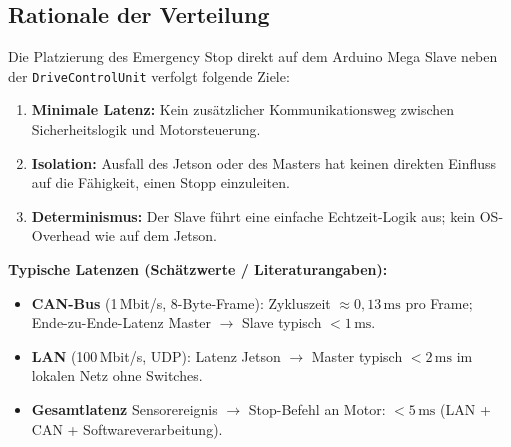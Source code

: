 \subsection{Rationale der Verteilung}

Die Platzierung des Emergency Stop direkt auf dem Arduino Mega Slave
neben der \texttt{DriveControlUnit} verfolgt folgende Ziele:

\begin{enumerate}
  \item \textbf{Minimale Latenz:} Kein zusätzlicher Kommunikationsweg zwischen
        Sicherheitslogik und Motorsteuerung.
  \item \textbf{Isolation:} Ausfall des Jetson oder des Masters hat keinen direkten
        Einfluss auf die Fähigkeit, einen Stopp einzuleiten.
  \item \textbf{Determinismus:} Der Slave führt eine einfache Echtzeit-Logik aus;
        kein \ac{OS}-Overhead wie auf dem Jetson.
\end{enumerate}

\textbf{Typische Latenzen (Schätzwerte / Literaturangaben):}
\begin{itemize}
  \item \textbf{\ac{CAN}-Bus} (1\,Mbit/s, 8-Byte-Frame):
        Zykluszeit $\approx 0{,}13\,\mathrm{ms}$ pro Frame;
        Ende-zu-Ende-Latenz Master $\to$ Slave typisch $< 1\,\mathrm{ms}$.
  \item \textbf{\ac{LAN}} (100\,Mbit/s, \ac{UDP}):
        Latenz Jetson $\to$ Master typisch $< 2\,\mathrm{ms}$
        im lokalen Netz ohne Switches.
  \item \textbf{Gesamtlatenz} Sensorereignis $\to$ Stop-Befehl an Motor:
        $< 5\,\mathrm{ms}$ (LAN + CAN + Softwareverarbeitung).
\end{itemize}
